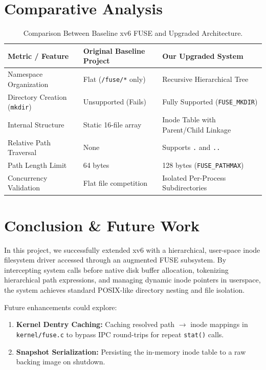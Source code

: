 \documentclass[11pt,a4paper]{article}
\begin{document}
\section{Comparative Analysis}
\begin{table}[htbp]
\centering
\begin{tabular}{@{}lll@{}}
\toprule
\textbf{Metric / Feature} & \textbf{Original Baseline Project} & \textbf{Our Upgraded System} \\ \midrule
Namespace Organization    & Flat (\texttt{/fuse/*} only)       & Recursive Hierarchical Tree \\
Directory Creation (\texttt{mkdir}) & Unsupported (Fails)     & Fully Supported (\texttt{FUSE\_MKDIR}) \\
Internal Structure        & Static 16-file array               & Inode Table with Parent/Child Linkage \\
Relative Path Traversal   & None                               & Supports \texttt{.} and \texttt{..} \\
Path Length Limit         & 64 bytes                           & 128 bytes (\texttt{FUSE\_PATHMAX}) \\
Concurrency Validation    & Flat file competition              & Isolated Per-Process Subdirectories \\ \bottomrule
\end{tabular}
\caption{Comparison Between Baseline xv6 FUSE and Upgraded Architecture.}
\label{tab:comparison}
\end{table}

\section{Conclusion \& Future Work}
In this project, we successfully extended xv6 with a hierarchical, user-space inode filesystem driver accessed through an augmented FUSE subsystem. By intercepting system calls before native disk buffer allocation, tokenizing hierarchical path expressions, and managing dynamic inode pointers in userspace, the system achieves standard POSIX-like directory nesting and file isolation.

Future enhancements could explore:
\begin{enumerate}[noitemsep]
    \item \textbf{Kernel Dentry Caching:} Caching resolved path $\to$ inode mappings in \texttt{kernel/fuse.c} to bypass IPC round-trips for repeat \texttt{stat()} calls.
    \item \textbf{Snapshot Serialization:} Persisting the in-memory inode table to a raw backing image on shutdown.
\end{enumerate}
\end{document}
